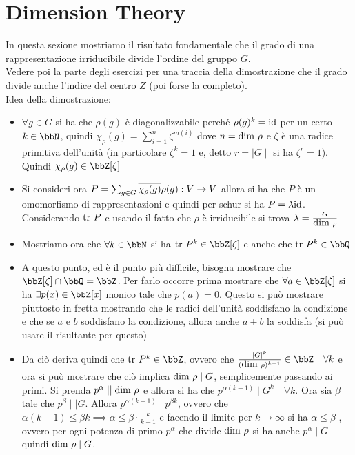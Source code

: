 \documentclass[a4paper,NoNotes,GeneralMath]{stdmdoc}
\begin{document}
	\section{Dimension Theory}
	In questa sezione mostriamo il risultato fondamentale che il grado di una rappresentazione irriducibile divide l'ordine del gruppo $G$.  \\
	Vedere poi la parte degli esercizi per una traccia della dimostrazione che il grado divide anche l'indice del centro $Z$ (poi forse la completo). \\
	Idea della dimostrazione:
	\begin{itemize}
		\item $\forall g \in G$ si ha che $\rho(g)$ è diagonalizzabile perché $\rho(g)^k = \mbox{id}$ per un certo $k \in \bbN$, quindi $\chi_\rho(g) = \sum_{i=1}^n \zeta^{m(i)}$ dove $n = \mbox{dim } \rho$ e $\zeta$ è una radice primitiva dell'unità (in particolare $\zeta^k = 1$ e, detto $r = \mid G \mid$ si ha $\zeta^r = 1$). Quindi $\chi_\rho(g) \in \bbZ[\zeta]$
		\item Si consideri ora $P = \sum_{g \in G} \overline{\chi_\rho(g)} \rho(g): V \rightarrow V$ allora si ha che $P$ è un omomorfismo di rappresentazioni e quindi per schur si ha $P = \lambda \mbox{id}$. Considerando $\mbox{tr } P$ e usando il fatto che $\rho$ è irriducibile si trova $\lambda = \frac{\mid G \mid}{\mbox{dim } \rho}$
		\item Mostriamo ora che $\forall k \in \bbN$ si ha $\Tr P^k \in \bbZ[\zeta]$ e anche che $\Tr P^k \in \bbQ$
		\item A questo punto, ed è il punto più difficile, bisogna mostrare che $\bbZ[\zeta] \cap \bbQ = \bbZ$. Per farlo occorre prima mostrare che $\forall a \in \bbZ[\zeta]$ si ha $\exists p(x) \in \bbZ[x]$ monico tale che $p(a) = 0$. Questo si può mostrare piuttosto in fretta mostrando che le radici dell'unità soddisfano la condizione e che se $a$ e $b$ soddisfano la condizione, allora anche $a+b$ la soddisfa (si può usare il risultante per questo)
		\item Da ciò deriva quindi che $\Tr P^k \in \bbZ$, ovvero che $\frac{\mid G \mid^k}{(\Dim \rho)^{k-1}} \in \bbZ \quad \forall k$ e ora si può mostrare che ciò implica $\mbox{dim } \rho \mid G$, semplicemente passando ai primi. Si prenda $p^\alpha \mid\mid \mbox{dim } \rho$ e allora si ha che $p^{\alpha (k-1)} \mid G^k \quad \forall k$. Ora sia $\beta$ tale che $p^\beta \mid\mid G$. Allora $p^{\alpha (k-1)} \mid p^{\beta k}$, ovvero che $\alpha (k-1) \le \beta k \implies \alpha \le \beta \cdot \frac{k}{k-1}$ e facendo il limite per $k \to \infty$ si ha $\alpha \le \beta$ , ovvero per ogni potenza di primo $p^\alpha$ che divide $\mbox{dim } \rho$ si ha anche $p^\alpha \mid G$ quindi $\mbox{dim } \rho \mid G$.
	\end{itemize}
\end{document}
